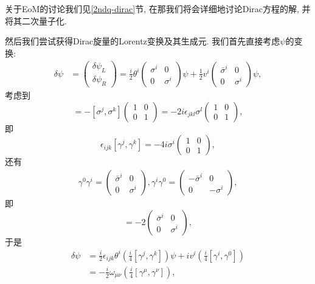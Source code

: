 关于EoM的讨论我们见\ref{2ndq-dirac}节, 在那我们将会详细地讨论Dirac方程的解, 并将其二次量子化.

然后我们尝试获得Dirac旋量的Lorentz变换及其生成元. 我们首先直接考虑$\psi$的变换:
\begin{align}
    \delta\psi&=\begin{pmatrix}
        \delta\psi_L\\
        \delta\psi_R
    \end{pmatrix}=\frac i2\theta^i\begin{pmatrix}
        \sigma^i & 0\\
        0 & \sigma^i
    \end{pmatrix}\psi+\frac12v^i\begin{pmatrix}
        \bar\sigma^i & 0\\
        0 & \sigma^i
    \end{pmatrix}\psi,
\end{align}
考虑到
\begin{equation}
    [\gamma^j, \gamma^k]=-[\sigma^j, \sigma^k]\begin{pmatrix}
        1 & 0\\
        0 & 1
    \end{pmatrix}=-2i\epsilon_{jkl}\sigma^l\begin{pmatrix}
        1 & 0\\
        0 & 1
    \end{pmatrix},
\end{equation}
即
\begin{equation}
    \epsilon_{ijk}[\gamma^j, \gamma^k]=-4i\sigma^i\begin{pmatrix}
        1 & 0\\
        0 & 1
    \end{pmatrix},
\end{equation}
还有
\begin{align}
    \gamma^0\gamma^i=\begin{pmatrix}
        \bar\sigma^i & 0\\
        0 & \sigma^i
    \end{pmatrix}, \gamma^i\gamma^0=\begin{pmatrix}
        -\bar\sigma^i & 0\\
        0 & -\sigma^i
    \end{pmatrix},
\end{align}
即
\begin{equation}
    [\gamma^i, \gamma^0]=-2\begin{pmatrix}
        \bar\sigma^i & 0\\
        0 & \sigma^i
    \end{pmatrix},
\end{equation}
于是
\begin{align}
    \delta\psi&=\frac i2\epsilon_{ijk}\theta^i(\frac i4[\gamma^j, \gamma^k])\psi+iv^i(\frac i4[\gamma^i, \gamma^0])\\
    &=-\frac i2\omega_{\mu\nu}(\frac i4[\gamma^\mu, \gamma^\nu]),
\end{align}

